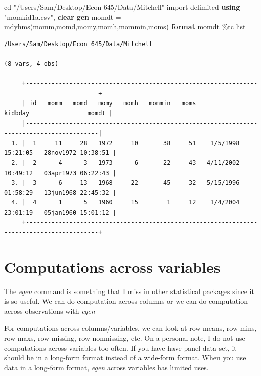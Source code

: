 \documentclass[
]{book}
\newenvironment{Shaded}{\begin{snugshade}}{\end{snugshade}}
\newcommand{\KeywordTok}[1]{\textcolor[rgb]{0.13,0.29,0.53}{\textbf{#1}}}
\newcommand{\NormalTok}[1]{#1}
\newcommand{\OtherTok}[1]{\textcolor[rgb]{0.56,0.35,0.01}{#1}}
\newcommand{\StringTok}[1]{\textcolor[rgb]{0.31,0.60,0.02}{#1}}
\begin{document}
\begin{Shaded}
\begin{Highlighting}[]
\NormalTok{cd }\StringTok{"/Users/Sam/Desktop/Econ 645/Data/Mitchell"}
\NormalTok{import delimited }\KeywordTok{using} \StringTok{"momkid1a.csv"}\NormalTok{, }\KeywordTok{clear}
\KeywordTok{gen}\NormalTok{ momdt = mdyhms(momm,momd,momy,momh,mommin,moms)}
\KeywordTok{format}\NormalTok{ momdt \%tc}
\OtherTok{list} 
\end{Highlighting}
\end{Shaded}

\begin{verbatim}
/Users/Sam/Desktop/Econ 645/Data/Mitchell

(8 vars, 4 obs)

     +------------------------------------------------------------------------------------------+
     | id   momm   momd   momy   momh   mommin   moms              kidbday                momdt |
     |------------------------------------------------------------------------------------------|
  1. |  1     11     28   1972     10       38     51    1/5/1998 15:21:05   28nov1972 10:38:51 |
  2. |  2      4      3   1973      6       22     43   4/11/2002 10:49:12   03apr1973 06:22:43 |
  3. |  3      6     13   1968     22       45     32   5/15/1996 01:58:29   13jun1968 22:45:32 |
  4. |  4      1      5   1960     15        1     12    1/4/2004 23:01:19   05jan1960 15:01:12 |
     +------------------------------------------------------------------------------------------+
\end{verbatim}

\section{Computations across variables}\label{computations-across-variables}

The \emph{egen} command is something that I miss in other statistical packages since it is so useful. We can do computation across columns or we can do computation across observations with \emph{egen}

For computations across columns/variables, we can look at row means, row mins, row maxs, row missing, row nonmissing, etc. On a personal note, I do not use computations across variables too often. If you have have panel data set, it should be in a long-form format instead of a wide-form format. When you use data in a long-form format, \emph{egen} across variables has limited uses.
\end{document}
